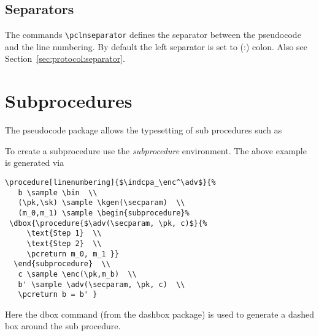 \documentclass[a4paper]{report}
\begin{document}
\subsection{Separators}
The commands \lstinline$\pclnseparator$ defines the separator between the pseudocode and the line numbering. By
default the left separator is set to (:) colon. Also see Section~\ref{sec:protocol:separator}.


\section{Subprocedures}
The pseudocode package allows the typesetting of sub procedures such as

\begin{center}
 \end{center}

To create a subprocedure use the \emph{subprocedure} environment. The above example is generated via
 \begin{lstlisting}
\procedure[linenumbering]{$\indcpa_\enc^\adv$}{%
   b \sample \bin  \\
   (\pk,\sk) \sample \kgen(\secparam)  \\
   (m_0,m_1) \sample \begin{subprocedure}%
 \dbox{\procedure{$\adv(\secparam, \pk, c)$}{%
  	 \text{Step 1}  \\
  	 \text{Step 2}  \\
	 \pcreturn m_0, m_1 }}
  \end{subprocedure}  \\
   c \sample \enc(\pk,m_b)  \\
   b' \sample \adv(\secparam, \pk, c)  \\
   \pcreturn b = b' }
\end{lstlisting}
Here the dbox command (from the dashbox package) is used to generate a dashed box around the sub procedure.
\end{document}
